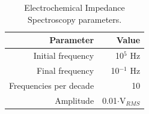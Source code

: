 \begin{itemize}
\begin{table}[h]
	\centering
	\caption{Electrochemical Impedance Spectroscopy parameters.}
	\begin{tabular}{r r} \hline
		Parameter	& Value \\ \hline
		Initial frequency	& 10$^{5}$ Hz  \\ 
		Final frequency	& 10$^{-1}$ Hz \\ 
		Frequencies per decade	& 10 \\ 
		Amplitude	& 0.01$\cdot$V$_{RMS}$ \\ \hline
	\end{tabular}
	\label{tab:EIS}
\end{table}


\end{itemize}


